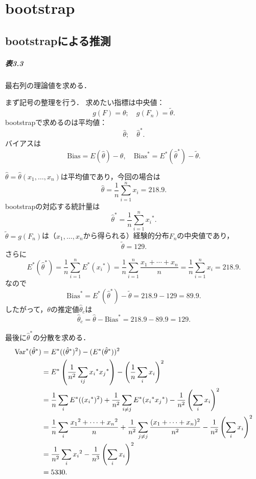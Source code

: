\setcounter{chapter}{2}
\chapter{bootstrap}
\setcounter{section}{2}
\section{bootstrapによる推測}
\paragraph{表3.3}
最右列の理論値を求める．

まず記号の整理を行う．
求めたい指標は中央値：
\[ g(F) = \theta ; \quad g(F_n) = \tilde\theta . \]
bootstrapで求めるのは平均値：
\[ \hat\theta ; \quad \hat{\theta}^\ast . \]
バイアスは
\[ \text{Bias} = E(\hat\theta) - \theta , \quad \text{Bias}^\ast = E^\ast(\hat{\theta}^\ast) - \tilde\theta . \]

\(\hat\theta = \hat\theta(x_1 , \ldots , x_n)\)は平均値であり，今回の場合は
\[ \hat\theta = \frac{1}{n} \sum_{i=1}^{n} x_i = 218.9 . \]
bootstrapの対応する統計量は
\[ \hat{\theta}^\ast = \frac{1}{n} \sum_{i=1}^{n} x_i{}^\ast . \]
\(\tilde\theta = g(F_n)\)は（\(x_1, \ldots, x_n\)から得られる）経験的分布\(F_n\)の中央値であり，
\[ \tilde\theta = 129 . \]
さらに
\[
  E^\ast(\hat{\theta}^\ast)
  = \frac{1}{n} \sum_{i=1}^{n} E^\ast(x_i{}^\ast)
  = \frac{1}{n} \sum_{i=1}^{n} \frac{x_1 + \cdots + x_n}{n}
  = \frac{1}{n} \sum_{i=1}^{n} x_i
  = 218.9 .
\]
なので
\[ \text{Bias}^\ast = E^\ast(\hat{\theta}^\ast) - \tilde\theta = 218.9 - 129 = 89.9 . \]
したがって，\(\theta\)の推定値\(\hat\theta_c\)は
\[ \hat\theta_c = \hat\theta - \text{Bias}^\ast = 218.9 - 89.9 = 129 . \]

最後に\(\hat{\theta}^\ast\)の分散を求める．
\begin{align*}
  \operatorname{Var}^\ast(\hat{\theta}^\ast) &= E^\ast((\hat{\theta}^\ast)^2) - (E^\ast(\hat{\theta}^\ast))^2 \\
  &= E^\ast\left( \frac{1}{n^2} \sum_{ij} x_i{}^\ast x_j{}^\ast \right) - \left( \frac{1}{n} \sum_i x_i \right)^2 \\
  &= \frac{1}{n} \sum_i E^\ast((x_i{}^\ast)^2)
  + \frac{1}{n^2} \sum_{i\neq j} E^\ast(x_i{}^\ast x_j{}^\ast)
  - \frac{1}{n^2} \left( \sum_i x_i \right)^2 \\
  &= \frac{1}{n} \sum_i \frac{x_1{}^2 + \cdots + x_n{}^2}{n}
  + \frac{1}{n^2} \sum_{j\neq j} \frac{(x_1 + \cdots + x_n)^2}{n^2}
  - \frac{1}{n^2} \left( \sum_i x_i \right)^2 \\
  &= \frac{1}{n^2} \sum_i x_i{}^2 - \frac{1}{n^3} \left( \sum_i x_i \right)^2 \\
  &= 5330 .
\end{align*}

